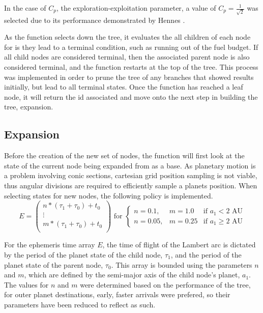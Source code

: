 \documentclass[letterpaper, preprint, paper,11pt]{AAS}	%
\begin{document}
In the case of $C_p$, the exploration-exploitation parameter, a value of $C_p = \frac{1}{\sqrt{2}}$ was selected due to its performance demonstrated by Hennes \cite{Hennes2015}. 

As the function selects down the tree, it evaluates the all children of each node for is they lead to a terminal condition, such as running out of the fuel budget. If all child nodes are considered terminal, then the associated parent node is also considered terminal, and the function restarts at the top of the tree. This process was implemented in order to prune the tree of any branches that showed results initially, but lead to all terminal states. Once the function has reached a leaf node, it will return the id associated and move onto the next step in building the tree, expansion.

\subsection{Expansion}
Before the creation of the new set of nodes, the function will first look at the state of the current node being expanded from as a base. As planetary motion is a problem involving conic sections, cartesian grid position sampling is not viable, thus angular divisions are required to efficiently sample a planets position. When selecting states for new nodes, the following policy is implemented. 
\begin{equation*}
    E = 
    \left(\begin{array}{c}
        n*(\tau_1 + \tau_0) + t_0 \\ 
        \vdots \\
        m*(\tau_1 + \tau_0) + t_0 \\
    \end{array}\right)
    \text{ for } 
    \left\{\begin{array}{llr} 
        n = 0.1, & m = 1.0 &\text{if } a_1 < 2 \text{ AU} \\ 
        n = 0.05, & m = 0.25 &\text{if } a_1 \geq 2 \text{ AU}
    \end{array}\right.
\end{equation*}

For the ephemeris time array $E$, the time of flight of the Lambert arc is dictated by the period of the planet state of the child node, $\tau_1$, and the period of the planet state of the parent node, $\tau_0$. This array is bounded using the parameters $n$ and $m$, which are defined by the semi-major axis of the child node's planet, $a_1$. The values for $n$ and $m$ were determined based on the performance of the tree, for outer planet destinations, early, faster arrivals were prefered, so their parameters have been reduced to reflect as such. 
\end{document}
